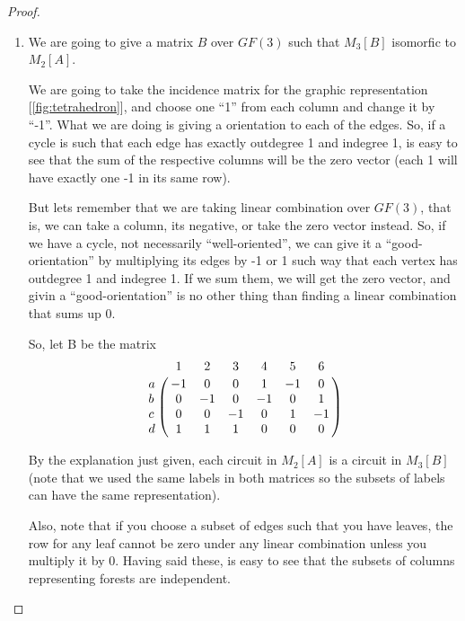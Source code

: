 \begin{proof}
\begin{enumerate}[label=(\roman*)]
        \item\label{t1:p1iii}
            We are going to give a matrix $B$ over $GF(3)$ such that $M_3[B]$ isomorfic to $M_2[A]$.\pn
            
            We are going to take the incidence matrix for the graphic representation [\ref{fig:tetrahedron}], and
            choose one ``1'' from each column and change it by ``-1''. What we are doing is giving a orientation
            to each of the edges. So, if a cycle is such that each edge has exactly outdegree 1 and indegree 1, is
            easy to see that the sum of the respective columns will be the zero vector (each 1 will have exactly one -1 in
            its same row).\pn
            
            But lets remember that we are taking linear combination over $GF(3)$, that is, we can take a column, 
            its negative, or take the zero vector instead. So, if we have a cycle, not necessarily ``well-oriented'',
            we can give it a ``good-orientation'' by multiplying its edges by -1 or 1 such way that each vertex 
            has outdegree 1 and indegree 1. If we sum them, we will get the zero vector, and givin a ``good-orientation'' is
            no other thing than finding a linear combination that sums up 0.\pn
            
            So, let B be the matrix
            $$\bordermatrix{
                    &   1   &   2   &   3   &   4   &   5   &   6   \cr
                a   &   -1  &   0   &   0   &   1   &   -1  &   0   \cr
                b   &   0   &   -1  &   0   &   -1  &   0   &   1   \cr
                c   &   0   &   0   &   -1  &   0   &   1   &   -1  \cr
                d   &   1   &   1   &   1   &   0   &   0   &   0   \cr
            }$$
            
            By the explanation just given, each circuit in $M_2[A]$ is a circuit in $M_3[B]$ (note that we used the same 
            labels in both matrices so the subsets of labels can have the same representation).\pn
            
            Also, note that if you choose a subset of edges such that you have leaves, the row for any leaf cannot be
            zero under any linear combination unless you multiply it by 0. Having said these, is easy to see that
            the subsets of columns representing forests are independent.\pn
            

\end{enumerate}
\end{proof}
